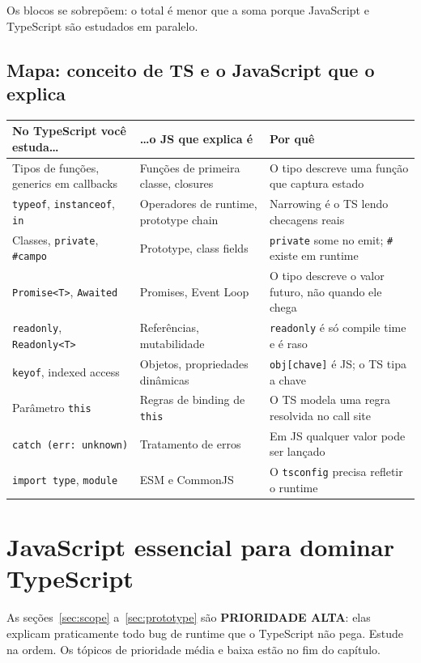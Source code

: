 \documentclass[12pt,a4paper,oneside]{book}
\newcommand{\alta}{\colorbox{red!15}{\sffamily\scriptsize\bfseries PRIORIDADE ALTA}}
\newcommand{\code}[1]{\texttt{#1}}
\begin{document}
Os blocos se sobrepõem: o total é menor que a soma porque JavaScript e TypeScript são estudados em paralelo.

\section{Mapa: conceito de TS e o JavaScript que o explica}

{\small
\begin{tabularx}{\textwidth}{@{}XXX@{}}
\toprule
\textbf{No TypeScript você estuda\ldots} & \textbf{\ldots o JS que explica é} & \textbf{Por quê} \\
\midrule
Tipos de funções, generics em callbacks & Funções de primeira classe, closures & O tipo descreve uma função que captura estado \\
\code{typeof}, \code{instanceof}, \code{in} & Operadores de runtime, prototype chain & Narrowing é o TS lendo checagens reais \\
Classes, \code{private}, \code{\#campo} & Prototype, class fields & \code{private} some no emit; \code{\#} existe em runtime \\
\code{Promise<T>}, \code{Awaited} & Promises, Event Loop & O tipo descreve o valor futuro, não quando ele chega \\
\code{readonly}, \code{Readonly<T>} & Referências, mutabilidade & \code{readonly} é só compile time e é raso \\
\code{keyof}, indexed access & Objetos, propriedades dinâmicas & \code{obj[chave]} é JS; o TS tipa a chave \\
Parâmetro \code{this} & Regras de binding de \code{this} & O TS modela uma regra resolvida no call site \\
\code{catch (err: unknown)} & Tratamento de erros & Em JS qualquer valor pode ser lançado \\
\code{import type}, \code{module} & ESM e CommonJS & O \code{tsconfig} precisa refletir o runtime \\
\bottomrule
\end{tabularx}
}

\chapter{JavaScript essencial para dominar TypeScript}
\label{cap:js}

As seções~\ref{sec:scope} a~\ref{sec:prototype} são \alta: elas explicam praticamente todo bug de runtime que o TypeScript não pega. Estude na ordem. Os tópicos de prioridade média e baixa estão no fim do capítulo.
\end{document}
